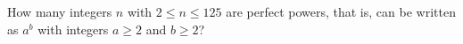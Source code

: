 How many integers $n$ with $2\le n\le125$ are perfect powers, that is, can be written as $a^b$ with integers $a\ge2$ and $b\ge2$?
